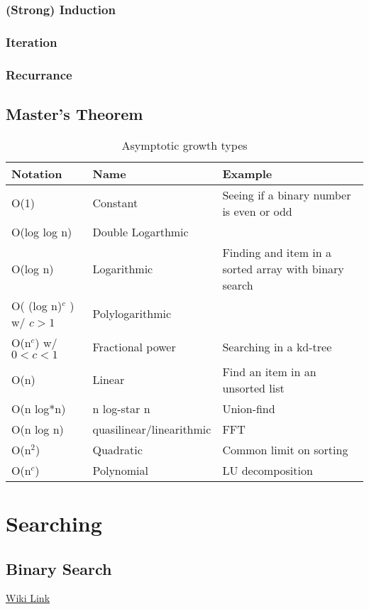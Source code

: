 \subsubsection{(Strong) Induction}
\subsubsection{Iteration}
\subsubsection{Recurrance}

\subsection{Master's Theorem}

\begin{table}
	\caption{Asymptotic growth types}
	\label{table:asymtoticGrowth}
\begin{tabular}{lll}
\hline\hline
Notation& Name& Example\\\hline
O(1)&Constant&Seeing if a binary number is even or odd\\
O(log log n) &Double Logarthmic& \\
O(log n)& Logarithmic& Finding and item in a sorted array with binary search\\
O( (log n)$^c$ ) w/ $c>1$& Polylogarithmic& \\
O(n$^c$) w/ $0<c<1$&Fractional power &Searching in a kd-tree \\
O(n)& Linear& Find an item in an unsorted list\\
O(n log*n)& n log-star n& Union-find\\
O(n log n)& quasilinear/linearithmic& FFT\\
O(n$^2$)& Quadratic&Common limit on sorting\\
O(n$^c$)& Polynomial& LU decomposition\\
\hline\hline
\end{tabular}
\end{table}

\section{Searching}
\subsection{Binary Search}

\href{https://en.wikipedia.org/wiki/Binary_search_algorithm}{Wiki Link}

